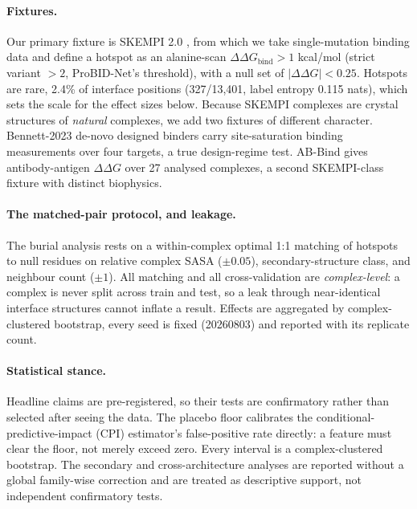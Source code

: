 \documentclass{article} %
\begin{document}
\paragraph{Fixtures.} Our primary fixture is SKEMPI 2.0 \citep{jankauskaite2019skempi}, from which we take single-mutation binding data and define
a hotspot as an alanine-scan $\Delta\Delta G_{\text{bind}} > 1$ kcal/mol (strict variant $> 2$, ProBID-Net's
threshold), with a null set of $|\Delta\Delta G| < 0.25$. Hotspots are rare, 2.4\% of interface positions
(327/13{,}401, label entropy 0.115 nats), which sets the scale for the effect sizes below. Because SKEMPI
complexes are crystal structures of \emph{natural} complexes, we add two fixtures of different character.
Bennett-2023 de-novo designed binders \citep{bennett2023denovo} carry site-saturation binding measurements over four targets, a true
design-regime test. AB-Bind \citep{sirin2016abbind} gives antibody-antigen $\Delta\Delta G$ over 27 analysed complexes, a second
SKEMPI-class fixture with distinct biophysics.

\paragraph{The matched-pair protocol, and leakage.} The burial analysis rests on a within-complex optimal 1:1
matching of hotspots to null residues on relative complex SASA ($\pm 0.05$), secondary-structure class, and
neighbour count ($\pm 1$). All matching and all cross-validation are \emph{complex-level}: a complex is never
split across train and test, so a leak through near-identical interface structures cannot inflate a result.
Effects are aggregated by complex-clustered bootstrap, every seed is fixed (20260803) and reported with its
replicate count.

\paragraph{Statistical stance.} Headline claims are pre-registered, so their tests are confirmatory rather than
selected after seeing the data. The placebo floor calibrates the conditional-predictive-impact (CPI) estimator's
false-positive rate directly: a feature must clear the floor, not merely exceed zero. Every interval is a
complex-clustered bootstrap. The secondary and cross-architecture analyses are reported without a global
family-wise correction and are treated as descriptive support, not independent confirmatory tests.
\end{document}
